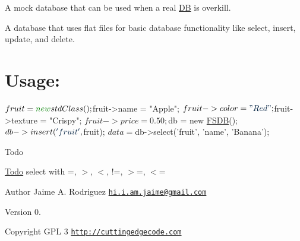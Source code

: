 A mock database that can be used when a real \hyperlink{class_d_b}{D\-B} is overkill.

A database that uses flat files for basic database functionality like select, insert, update, and delete.\hypertarget{nav1_usage}{}\section{Usage\-:}\label{nav1_usage}

\begin{DoxyCode}
$fruit = \textcolor{keyword}{new} stdClass();
$fruit->name = \textcolor{stringliteral}{"Apple"};
$fruit->color = \textcolor{stringliteral}{"Red"};
$fruit->texture = \textcolor{stringliteral}{"Crispy"};
$fruit->price = 0.50;

$db = \textcolor{keyword}{new} \hyperlink{class_f_s_d_b}{FSDB}();
$db->insert(\textcolor{stringliteral}{'fruit'}, $fruit);
$data = $db->select(\textcolor{stringliteral}{'fruit'}, \textcolor{stringliteral}{'name'}, \textcolor{stringliteral}{'Banana'});
\end{DoxyCode}


\begin{DoxyRefDesc}{Todo}
\item[\hyperlink{todo__todo000002}{Todo}]select with =, $>$, $<$, !=, $>$=, $<$= \end{DoxyRefDesc}
\begin{DoxyAuthor}{Author}
Jaime A. Rodriguez \href{mailto:hi.i.am.jaime@gmail.com}{\tt hi.\-i.\-am.\-jaime@gmail.\-com} 
\end{DoxyAuthor}
\begin{DoxyVersion}{Version}
0. 
\end{DoxyVersion}
\begin{DoxyCopyright}{Copyright}
G\-P\-L 3 \href{http://cuttingedgecode.com}{\tt http\-://cuttingedgecode.\-com} 
\end{DoxyCopyright}
